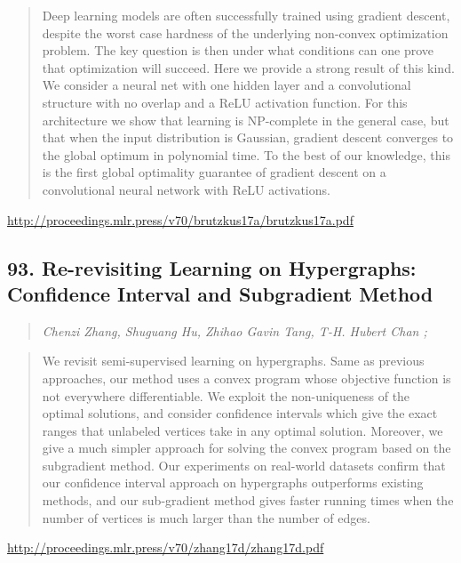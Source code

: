 \documentclass{article}
\begin{document}
\begin{quote}
    Deep learning models are often successfully trained using gradient descent, despite the worst case hardness of the underlying non-convex optimization problem. The key question is then under what conditions can one prove that optimization will succeed. Here we provide a strong result of this kind. We consider a neural net with one hidden layer and a convolutional structure with no overlap and a ReLU activation function. For this architecture we show that learning is NP-complete in the general case, but that when the input distribution is Gaussian, gradient descent converges to the global optimum in polynomial time. To the best of our knowledge, this is the first global optimality guarantee of gradient descent on a convolutional neural network with ReLU activations.  
\end{quote}

\href{http://proceedings.mlr.press/v70/brutzkus17a/brutzkus17a.pdf}{http://proceedings.mlr.press/v70/brutzkus17a/brutzkus17a.pdf}

\subsection{93. Re-revisiting Learning on Hypergraphs: Confidence Interval and Subgradient Method}

\begin{quote}
\footnotesize{\textit{Chenzi Zhang, Shuguang Hu, Zhihao Gavin Tang, T-H. Hubert Chan ;}}

\end{quote}

\begin{quote}
    We revisit semi-supervised learning on hypergraphs. Same as previous approaches, our method uses a convex program whose objective function is not everywhere differentiable. We exploit the non-uniqueness of the optimal solutions, and consider confidence intervals which give the exact ranges that unlabeled vertices take in any optimal solution. Moreover, we give a much simpler approach for solving the convex program based on the subgradient method. Our experiments on real-world datasets confirm that our confidence interval approach on hypergraphs outperforms existing methods, and our sub-gradient method gives faster running times when the number of vertices is much larger than the number of edges.  
\end{quote}

\href{http://proceedings.mlr.press/v70/zhang17d/zhang17d.pdf}{http://proceedings.mlr.press/v70/zhang17d/zhang17d.pdf}
\end{document}

